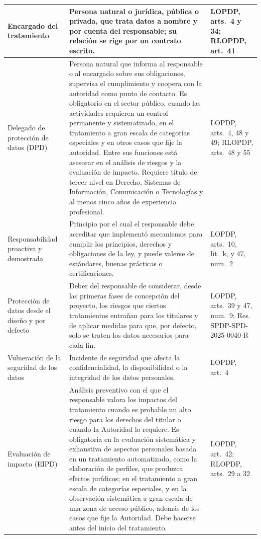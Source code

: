 {\begin{xltabular}{\textwidth}{|>{\raggedright\arraybackslash}p{3.2cm}|L|>{\raggedright\arraybackslash}p{2.6cm}|}
  \hline
  Encargado del tratamiento & Persona natural o jurídica, pública o privada, que trata datos a nombre y por cuenta del responsable; su relación se rige por un contrato escrito. & LOPDP, arts.~4 y 34; RLOPDP, art.~41 \\
  \hline
  Delegado de protección de datos (DPD) & Persona natural que informa al responsable o al encargado sobre sus obligaciones, supervisa el cumplimiento y coopera con la autoridad como punto de contacto. Es obligatorio en el sector público, cuando las actividades requieren un control permanente y sistematizado, en el tratamiento a gran escala de categorías especiales y en otros casos que fije la autoridad. Entre sus funciones está asesorar en el análisis de riesgos y la evaluación de impacto. Requiere título de tercer nivel en Derecho, Sistemas de Información, Comunicación o Tecnologías y al menos cinco años de experiencia profesional. & LOPDP, arts.~4, 48 y 49; RLOPDP, arts.~48 y 55 \\
  \hline
  Responsabilidad proactiva y demostrada & Principio por el cual el responsable debe acreditar que implementó mecanismos para cumplir los principios, derechos y obligaciones de la ley, y puede valerse de estándares, buenas prácticas o certificaciones. & LOPDP, arts.~10, lit.~k, y 47, num.~2 \\
  \hline
  Protección de datos desde el diseño y por defecto & Deber del responsable de considerar, desde las primeras fases de concepción del proyecto, los riesgos que ciertos tratamientos entrañan para los titulares y de aplicar medidas para que, por defecto, solo se traten los datos necesarios para cada fin. & LOPDP, arts.~39 y 47, num.~9; Res. SPDP-SPD-2025-0040-R \\
  \hline
  Vulneración de la seguridad de los datos & Incidente de seguridad que afecta la confidencialidad, la disponibilidad o la integridad de los datos personales. & LOPDP, art.~4 \\
  \hline
  Evaluación de impacto (EIPD) & Análisis preventivo con el que el responsable valora los impactos del tratamiento cuando es probable un alto riesgo para los derechos del titular o cuando la Autoridad lo requiere. Es obligatoria en la evaluación sistemática y exhaustiva de aspectos personales basada en un tratamiento automatizado, como la elaboración de perfiles, que produzca efectos jurídicos; en el tratamiento a gran escala de categorías especiales, y en la observación sistemática a gran escala de una zona de acceso público, además de los casos que fije la Autoridad. Debe hacerse antes del inicio del tratamiento. & LOPDP, art.~42; RLOPDP, arts.~29 a 32 \\

\end{xltabular}}
